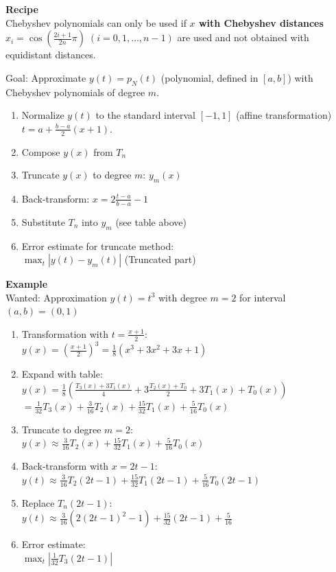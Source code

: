\begin{minipage}{9cm}
  \textbf{Recipe}\\
  Chebyshev polynomials can only be used if \textbf{$x$ with Chebyshev distances}
  $x_i=\cos(\frac{2i+1}{2n}\pi)\;(i=0,1,\ldots,n-1)$ are used and not
  obtained with equidistant distances.

  Goal: Approximate $y(t) = p_N(t)$ (polynomial, defined in $[a,b]$) with Chebyshev polynomials of degree
  $m$.
  \begin{enumerate}
    \item Normalize $y(t)$ to the standard interval $[-1,1]$ (affine transformation)
    $t = a + \frac{b-a}{2} (x+1)$.
    \item Compose $y(x)$ from $T_n$
    \item Truncate $y(x)$ to degree $m$: $y_m(x)$
    \item Back-transform: $x = 2\frac{t-a}{b-a}-1$
    \item Substitute $T_n$ into $y_m$ (see table above)
    \item Error estimate for truncate method:\\
      $\max_{t} |y(t) - y_m(t)|$ (Truncated part)
  \end{enumerate}
\end{minipage}
\hspace{1cm}
\begin{minipage}{9cm}
  \textbf{Example}\\
  Wanted: Approximation $y(t)=t^3$ with degree $m=2$ for interval $(a,b) = (0,1)$
  \begin{enumerate}
  	\item Transformation with $t = \frac{x+1}{2}$:\\
  	  $y(x) = \left( \frac{x+1}{2} \right)^3 = \frac18 (x^3 + 3x^2 + 3x + 1)$
  	\item Expand with table:\\
  	$y(x) = \frac18 \left( \frac{T_3(x) + 3 T_1(x)}{4} + 3 \frac{T_2(x) + T_0}{2} + 3T_1(x) + T_0(x) \right)$\\
  	$=\frac{1}{32}T_3(x) + \frac{3}{16}T_2(x) + \frac{15}{32} T_1(x) + \frac{5}{16}T_0(x)$
  	\item Truncate to degree $m=2$:\\
  	  $y(x) \approx \frac{3}{16}T_2(x) + \frac{15}{32}T_1(x) + \frac{5}{16}T_0(x)$
  	\item Back-transform with $x = 2t-1$:\\
  	  $y(t) \approx \frac{3}{16}T_2(2t-1) + \frac{15}{32}T_1(2t-1) + \frac{5}{16}T_0(2t-1)$
  	\item Replace $T_n(2t-1)$:\\
      $y(t) \approx \frac{3}{16} (2(2t-1)^2-1) + \frac{15}{32}(2t-1) + \frac{5}{16}$
    \item Error estimate:\\
      $\max_t \left| \frac{1}{32}T_3(2t-1) \right|$
  \end{enumerate}
\end{minipage}

